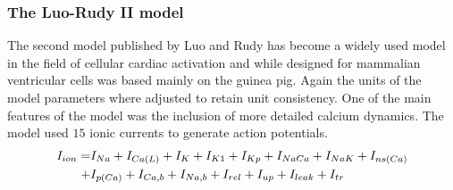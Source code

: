 %
\subsubsection{The Luo-Rudy II model}
The second model published by Luo and Rudy \cite{luo:1994a} has become a widely used
model in the field of cellular cardiac activation and while designed
for mammalian ventricular cells was based mainly on the guinea pig. Again the
units of the model parameters where adjusted to retain unit consistency. One
of the main features of the model was the inclusion of more detailed calcium
dynamics. The model used $15$ ionic currents to generate action potentials.
\begin{align}
  I_{ion} =&
  I_{Na}+I_{Ca\left( L \right)}+I_{K}+I_{K1}+I_{Kp}+I_{NaCa}+I_{NaK}+I_{ns\left( Ca \right)}\nonumber\\
  +& I_{p\left( Ca \right)}+I_{Ca,b}+I_{Na,b}+I_{rel}+I_{up}+I_{leak}+I_{tr}
\end{align}
%
